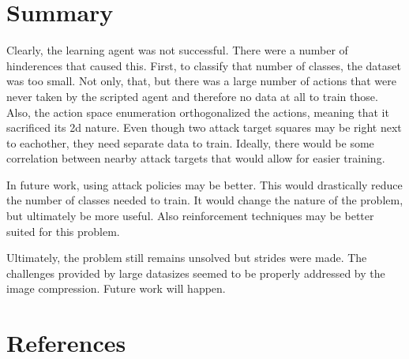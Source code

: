 \documentclass{amsart}
\theoremstyle{definition}
\begin{document}
\section{Summary}


Clearly, the learning agent was not successful.
There were a number of hinderences that caused this.
First, to classify that number of classes, the dataset was too small.
Not only, that, but there was a large number of actions that were never taken by the scripted agent and therefore no data at all to train those.
Also, the action space enumeration orthogonalized the actions, meaning that it sacrificed its 2d nature.
Even though two attack target squares may be right next to eachother, they need separate data to train.
Ideally, there would be some correlation between nearby attack targets that would allow for easier training.

In future work, using attack policies may be better.
This would drastically reduce the number of classes needed to train.
It would change the nature  of the problem, but ultimately be more useful.
Also reinforcement techniques may be better suited for this problem.

Ultimately, the problem still remains unsolved but strides were made.
The challenges provided by large datasizes seemed to be properly addressed by the image compression.
Future work will happen.









\section{References}

\end{document}
